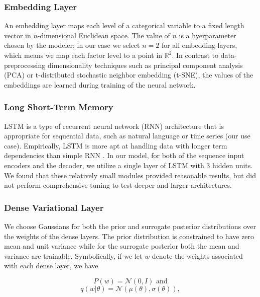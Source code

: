 \documentclass{article}
\begin{document}
\subsubsection{Embedding Layer}

An embedding layer maps each level of a categorical variable to a fixed length 
vector in $n$-dimensional Euclidean space. The value of $n$ is a hyerparameter 
chosen by the modeler; in our case we select $n = 2$ for all embedding layers, 
which means we map each factor level to a point in $\mathbb{R}^2$. In contrast 
to data-preprocessing dimensionality techniques such as principal component 
analysis (PCA) or t-distributed stochastic neighbor embedding (t-SNE), the 
values of the embeddings are learned during training of the neural network.

\subsubsection{Long Short-Term Memory}

LSTM is a type of recurrent neural network (RNN) architecture that is 
appropriate for sequential data, such as natural language or time series (our 
use case). Empirically, LSTM is more apt at handling data with longer term 
dependencies than simple RNN \cite{lecunDeepLearning2015}. In our model, for 
both of the sequence input encoders and the decoder, we utilize a single layer 
of LSTM with 3 hidden units. We found that these relatively small modules 
provided reasonable results, but did not perform comprehensive tuning to test
deeper and larger architectures. 

\subsubsection{Dense Variational Layer}

We choose Gaussians for both the prior and surrogate posterior distributions 
over the weights of the dense layers. The prior distribution is constrained to 
have zero mean and unit variance while for the surrogate posterior both the mean and
variance are trainable. Symbolically, if we let $w$ denote the weights 
associated with each dense layer, we have

\begin{equation}
    P(w) = \mathcal{N}(0, I) \text{ and}
\end{equation}
\begin{equation}
    q(w|\theta) = \mathcal{N}(\mu(\theta), \sigma(\theta)),
\end{equation}
\end{document}
